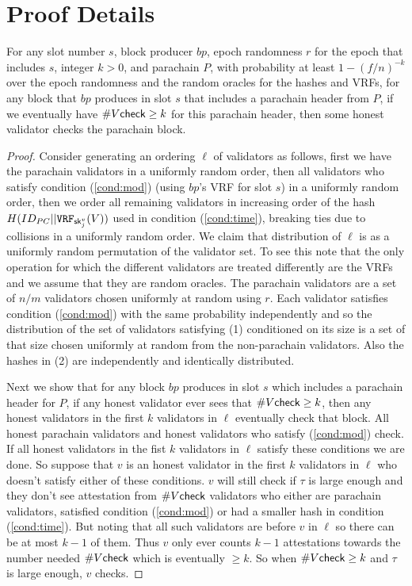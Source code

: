 \section{Proof Details}

\begin{lemma}\label{lem:permutation}
For any slot number $s$, block producer $bp$, epoch randomness $r$ for the epoch that includes $s$, integer $k >0$, and parachain $P$, with probability at least $1-(f/n)^{-k}$ over the epoch randomness and the random oracles for the hashes and VRFs, for any block that $bp$ produces in slot $s$ that includes a parachain header from $P$, if we eventually have $\#V\mathsf{check} \geq k$ for this parachain header, then some honest validator checks the parachain block.
\end{lemma}
\begin{proof}
Consider generating an ordering $\ell$ of validators as follows, first we have the parachain validators in a uniformly random order, then all validators who satisfy condition (\ref{cond:mod}) (using $bp$'s VRF for slot $s$) in a uniformly random order, then we order all remaining validators in increasing order of the hash $H(ID_{PC} || \mathtt{VRF}_{\mathsf{sk}^v_j}(V))$ used in condition (\ref{cond:time}), breaking ties due to collisions in a uniformly random order. We claim that distribution of $\ell$ is as a uniformly random permutation of the validator set. To see this note that the only operation for which the different validators are treated differently are the VRFs and we assume that they are random oracles. The parachain validators are a set of $n/m$ validators chosen uniformly at random using $r$. Each validator satisfies condition (\ref{cond:mod}) with the same probability independently and so the distribution of the set of validators satisfying (1) conditioned on its size is a set of that size chosen uniformly at random from the non-parachain validators. Also the hashes in (2) are independently and identically distributed.

Next we show that for any block $bp$ produces in slot $s$ which includes a parachain header for $P$,  if any honest validator ever sees that $\#V\mathsf{check} \geq k$, then any honest validators in the first $k$  validators in $\ell$ eventually check that block. All honest parachain validators and honest validators who satisfy (\ref{cond:mod}) check. If all honest validators in the fist $k$ validators in $\ell$ satisfy these conditions we are done. So suppose that $v$ is an honest validator in the first $k$ validators in $\ell$ who doesn't satisfy either of these conditions. $v$ will still check if $\tau$ is large enough and they don't see attestation from $\#V\mathsf{check}$ validators who either are parachain validators, satisfied condition (\ref{cond:mod})  or had a smaller hash in condition (\ref{cond:time}). But noting that all such validators are before $v$ in $\ell$ so there can be at most $k-1$ of them. Thus $v$ only ever counts $k-1$ attestations towards the number needed $\#V\mathsf{check}$ which is eventually $\geq k$. So when $\#V\mathsf{check} \geq k$ and $\tau$ is large enough, $v$ checks.


\end{proof}
